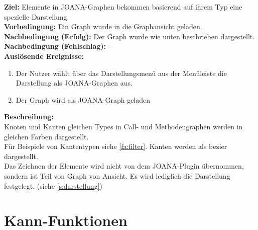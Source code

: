 \label{fa:joanaview}
\textbf{Ziel:} Elemente in JOANA-Graphen bekommen basierend auf ihrem Typ eine spezielle Darstellung.\\
\textbf{Vorbedingung:} Ein Graph wurde in die Graphansicht geladen.\\
\textbf{Nachbedingung (Erfolg):} Der Graph wurde wie unten beschrieben dargestellt.\\
\textbf{Nachbedingung (Fehlschlag):} -\\
\textbf{Auslösende Ereignisse:}
\begin{enumerate}[nolistsep, label=(\alph*)]
  \item Der Nutzer wählt über das Darstellungsmenü aus der Menüleiste die Darstellung als JOANA-Graphen aus.
  \item Der Graph wird als JOANA-Graph geladen
\end{enumerate}
\textbf{Beschreibung:}\\
Knoten und Kanten gleichen Types in Call- und Methodengraphen werden in gleichen Farben dargestellt.\\
Für Beispiele von Kantentypen siehe \ref{fa:filter}.
Kanten werden als \gls{bezier} dargestellt.\\
Das Zeichnen der Elemente wird nicht von dem JOANA-Plugin übernommen, sondern ist Teil von Graph von Ansicht. %
Es wird lediglich die Darstellung festgelegt. (siehe \ref{s:darstellung})


\label{fa:joanatyp}
\section{Kann-Funktionen}

